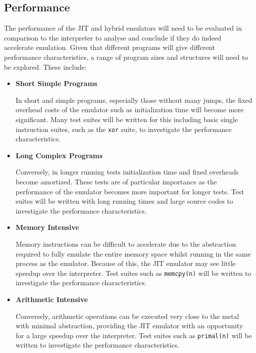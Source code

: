 \subsection{Performance}

The performance of the JIT and hybrid emulators will need to be evaluated in comparison to the interpreter to analyse and conclude if they do indeed accelerate emulation. Given that different programs will give different performance characteristics, a range of program sizes and structures will need to be explored. These include:

\begin{itemize}
    \item \textbf{Short Simple Programs}
    
    In short and simple programs, especially those without many jumps, the fixed overhead costs of the emulator such as initialization time will become more significant. Many test suites will be written for this including basic single instruction suites, such as the \texttt{xor} suite, to investigate the performance characteristics.
    
    \item \textbf{Long Complex Programs}
    
    Conversely, in longer running tests initialization time and fixed overheads become amortized. These tests are of particular importance as the performance of the emulator becomes more important for longer tests. Test suites will be written with long running times and large source codes to investigate the performance characteristics.

    \item \textbf{Memory Intensive}
    
    Memory instructions can be difficult to accelerate due to the abstraction required to fully emulate the entire memory space whilst running in the same process as the emulator. Because of this, the JIT emulator may see little speedup over the interpreter. Test suites such as \texttt{memcpy(n)} will be written to investigate the performance characteristics.

    \item \textbf{Arithmetic Intensive}
    
    Conversely, arithmetic operations can be executed very close to the metal with minimal abstraction, providing the JIT emulator with an opportunity for a large speedup over the interpreter. Test suites such as \texttt{primal(n)} will be written to investigate the performance characteristics.


\end{itemize}
